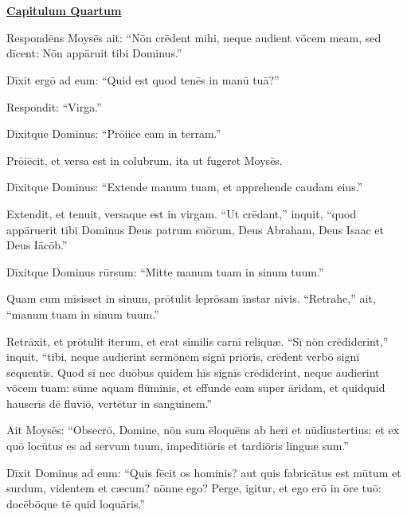 \chapter{}


{\begin{center}\large\bf\underline{Capitulum Quartum}\end{center}}
\vspace*{-1.0cm}

Respondēns Moysēs ait: ``Nōn crēdent mihi, neque audient vōcem meam, sed dīcent:
Nōn appāruit tibi Dominus.''

Dīxit ergō ad eum: ``Quid est quod tenēs in manū tuā?''

Respondit: ``Virga.''

 Dīxitque Dominus: ``Prōiice eam in terram.''

Prōiēcit, et versa est in colubrum, ita ut fugeret Moysēs. 

Dīxitque Dominus: ``Extende manum tuam, et apprehende caudam eius.''

Extendit, et tenuit, versaque est in virgam.
``Ut crēdant,'' inquit, ``quod appāruerit tibi Dominus Deus patrum suōrum,
Deus Abraham, Deus Isaac et Deus Iācōb.''

Dīxitque Dominus rūrsum: ``Mitte manum tuam in sinum tuum.''

Quam cum mīsisset in sinum, prōtulit leprōsam īnstar nivis.
``Retrahe,'' ait, ``manum tuam in sinum tuum.''

Retrāxit, et prōtulit iterum,
et erat similis carnī reliquæ.
``Sī nōn crēdiderint,'' inquit, ``tibi, neque audierint
sermōnem signī priōris, crēdent verbō signī sequentis. 
Quod sī nec duōbus quidem hīs signīs crēdiderint,
neque audierint vōcem tuam: sūme aquam flūminis,
et effunde eam super āridam, et quidquid hauserīs dē fluviō,
vertētur in sanguinem.''

Ait Moysēs: ``Obsecrō, Domine, nōn sum ēloquēns ab heri et
nūdiustertius: et ex quō locūtus es ad servum tuum,
impedītiōris et tardiōris linguæ sum.''

Dīxit Dominus ad eum: ``Quis fēcit os hominis?
aut quis fabricātus est mūtum et surdum,
videntem et cæcum? nōnne ego?
Perge, igitur, et ego erō in ōre tuō:
docēbōque tē quid loquāris.''

